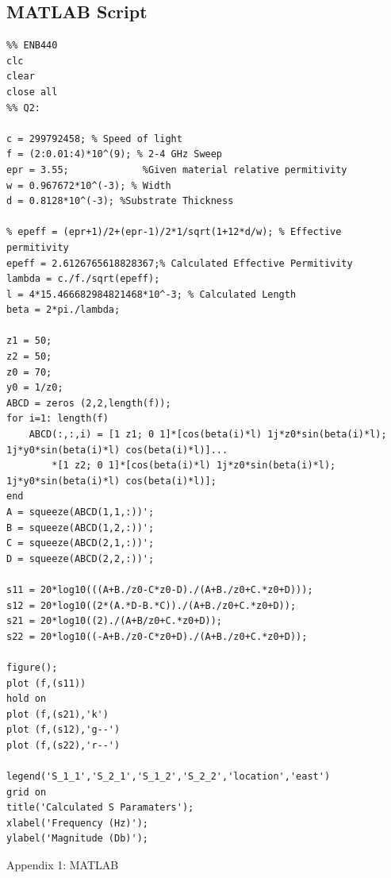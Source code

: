 \documentclass{paper}
\begin{document}
\subsection{MATLAB Script}
\begin{lstlisting}
%% ENB440
clc
clear
close all
%% Q2:

c = 299792458; % Speed of light
f = (2:0.01:4)*10^(9); % 2-4 GHz Sweep
epr = 3.55;             %Given material relative permitivity
w = 0.967672*10^(-3); % Width
d = 0.8128*10^(-3); %Substrate Thickness

% epeff = (epr+1)/2+(epr-1)/2*1/sqrt(1+12*d/w); % Effective permitivity
epeff = 2.6126765618828367;% Calculated Effective Permitivity
lambda = c./f./sqrt(epeff);
l = 4*15.466682984821468*10^-3; % Calculated Length
beta = 2*pi./lambda;

z1 = 50;
z2 = 50;
z0 = 70;
y0 = 1/z0;
ABCD = zeros (2,2,length(f));
for i=1: length(f)
    ABCD(:,:,i) = [1 z1; 0 1]*[cos(beta(i)*l) 1j*z0*sin(beta(i)*l); 1j*y0*sin(beta(i)*l) cos(beta(i)*l)]...
        *[1 z2; 0 1]*[cos(beta(i)*l) 1j*z0*sin(beta(i)*l); 1j*y0*sin(beta(i)*l) cos(beta(i)*l)];
end
A = squeeze(ABCD(1,1,:))';
B = squeeze(ABCD(1,2,:))';
C = squeeze(ABCD(2,1,:))';
D = squeeze(ABCD(2,2,:))';

s11 = 20*log10(((A+B./z0-C*z0-D)./(A+B./z0+C.*z0+D)));
s12 = 20*log10((2*(A.*D-B.*C))./(A+B./z0+C.*z0+D));
s21 = 20*log10((2)./(A+B/z0+C.*z0+D));
s22 = 20*log10((-A+B./z0-C*z0+D)./(A+B./z0+C.*z0+D));

figure();
plot (f,(s11))
hold on
plot (f,(s21),'k')
plot (f,(s12),'g--')
plot (f,(s22),'r--')

legend('S_1_1','S_2_1','S_1_2','S_2_2','location','east')
grid on
title('Calculated S Paramaters');
xlabel('Frequency (Hz)');
ylabel('Magnitude (Db)');
\end{lstlisting}
Appendix 1: MATLAB
\end{document}
